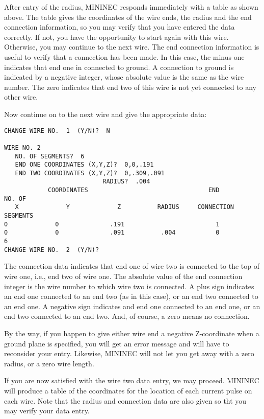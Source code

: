 \documentclass[12pt]{article}
\begin{document}
After entry of the radius, MININEC responds immediately with a table as
shown above. The table gives the coordinates of the wire ends, the
radius and the end connection information, so you may verify that you
have entered the data correctly. If not, you have the opportunity to
start again with this wire. Otherwise, you may continue to the next
wire. The end connection information is useful to verify that a
connection has been made. In this case, the minus one indicates that end
one in connected to ground. A connection to ground is indicated by a
negative integer, whose absolute value is the same as the wire number.
The zero indicates that end two of this wire is not yet connected to any
other wire.

Now continue on to the next wire and give the appropriate data:

\begin{Verbatim}
CHANGE WIRE NO.  1  (Y/N)?  N

WIRE NO. 2
   NO. OF SEGMENTS?  6
   END ONE COORDINATES (X,Y,Z)?  0,0,.191
   END TWO COORDINATES (X,Y,Z)?  0,.309,.091
                           RADIUS?  .004
            COORDINATES                                 END         NO. OF
   X             Y             Z          RADIUS     CONNECTION     SEGMENTS
0             0              .191                         1
0             0              .091          .004           0            6
CHANGE WIRE NO.  2  (Y/N)?
\end{Verbatim}

The connection data indicates that end one of wire two is connected to
the top of wire one, i.e., end two of wire one. The absolute value of
the end connection integer is the wire number to which wire two is
connected. A plus sign indicates an end one connected to an end two (as
in this case), or an end two connected to an end one. A negative sign
indicates and end one connected to an end one, or an end two connected
to an end two. And, of course, a zero means no connection.

By the way, if you happen to give either wire end a negative
Z-coordinate when a ground plane is specified, you will get an error
message and will have to reconsider your entry. Likewise, MININEC will
not let you get away with a zero radius, or a zero wire length.

If you are now satisfied with the wire two data entry, we may proceed.
MININEC will produce a table of the coordinates for the location of each
current pulse on each wire. Note that the radius and connection data are
also given so tht you may verify your data entry.
\end{document}
